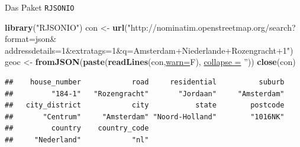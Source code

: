 \documentclass[ignorenonframetext,]{beamer}
\newenvironment{Shaded}{\begin{snugshade}}{\end{snugshade}}
\newcommand{\DataTypeTok}[1]{\textcolor[rgb]{0.74,0.68,0.62}{\underline{#1}}}
\newcommand{\DecValTok}[1]{\textcolor[rgb]{0.27,0.67,0.26}{#1}}
\newcommand{\KeywordTok}[1]{\textcolor[rgb]{0.26,0.66,0.93}{\textbf{#1}}}
\newcommand{\NormalTok}[1]{\textcolor[rgb]{0.74,0.68,0.62}{#1}}
\newcommand{\OperatorTok}[1]{\textcolor[rgb]{0.74,0.68,0.62}{#1}}
\newcommand{\StringTok}[1]{\textcolor[rgb]{0.02,0.61,0.04}{#1}}
\begin{document}
\begin{frame}[fragile]{Das Paket \texttt{RJSONIO}}
\protect\hypertarget{das-paket-rjsonio}{}

\begin{Shaded}
\begin{Highlighting}[]
\KeywordTok{library}\NormalTok{(}\StringTok{"RJSONIO"}\NormalTok{)}
\NormalTok{con <-}\StringTok{ }\KeywordTok{url}\NormalTok{(}\StringTok{"http://nominatim.openstreetmap.org/search?format=json&}
\StringTok{addressdetails=1&extratags=1&q=Amsterdam+Niederlande+Rozengracht+1"}\NormalTok{)}
\NormalTok{geoc <-}\StringTok{ }\KeywordTok{fromJSON}\NormalTok{(}\KeywordTok{paste}\NormalTok{(}\KeywordTok{readLines}\NormalTok{(con,}\DataTypeTok{warn=}\NormalTok{F), }
                       \DataTypeTok{collapse =} \StringTok{''}\NormalTok{))}
\KeywordTok{close}\NormalTok{(con)}
\end{Highlighting}
\end{Shaded}

\begin{Shaded}
\end{Shaded}

\begin{verbatim}
##    house_number            road     residential          suburb 
##         "184-1"   "Rozengracht"       "Jordaan"     "Amsterdam" 
##   city_district            city           state        postcode 
##       "Centrum"     "Amsterdam" "Noord-Holland"        "1016NK" 
##         country    country_code 
##     "Nederland"            "nl"
\end{verbatim}

\end{frame}
\end{document}
